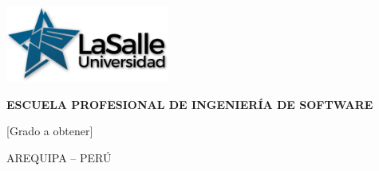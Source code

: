 \begin{titlepage}

    \includegraphics[width=0.4\textwidth]{Imagenes/La Salle Logo.png}
    
        \begin{center}
            \vspace*{1cm}
            \large{\textbf{ESCUELA PROFESIONAL DE INGENIERÍA DE SOFTWARE}}
            
            
            \vspace{1.5cm}
            \makeatletter
            \large{\@title}
            \makeatother
            
            
            \vspace{1.5cm}
            \makeatletter
            \@author
            \makeatother
            
            \vspace{1.5cm}
            [Grado a obtener]
            
            \vfill
            
            AREQUIPA – PERÚ
            
            \vspace{0.5cm}
            \makeatletter
            \@date
            \makeatother
        \end{center}

\end{titlepage}